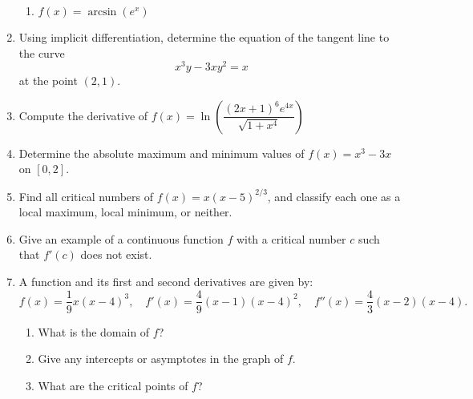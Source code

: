 \documentclass[12pt]{article}
\newcommand{\points}[1]{\marginpar{\hspace{24pt}[#1]}}
\begin{document}
\begin{enumerate}
\begin{enumerate}
 
 \item $f(x) = \arcsin(e^x)$ \points{2}
 \end{enumerate}

 
 \item Using implicit differentiation, determine the equation of the tangent line to the curve \points{6}
 \[
 x^3y-3xy^2=x
 \]
 at the point $(2,1)$.
 
 
 \item Compute the derivative of \points{4}
 $f(x) = \ln\left(\dfrac{(2x+1)^6e^{4x}}{\sqrt{1+x^4}}\right)$ 
 
 

 
 \item Determine the absolute maximum and minimum values of $f(x) = x^3-3x$ on $[0,2]$. \points{4}
 
 
 \item Find all critical numbers of $f(x) = x(x-5)^{2/3}$, and classify each one as a local maximum, local minimum, or neither. \points{4}
 
 
 \item Give an example of a continuous function $f$ with a critical number $c$ such that $f'(c)$ does not exist. \points{2} 
 
 
 \item A function and its first and second derivatives are given by:
 \[
 f(x)=\frac{1}{9}x(x-4)^3,\quad f'(x) = \frac{4}{9}(x-1)(x-4)^2, \quad f''(x) = \frac{4}{3}(x-2)(x-4).
 \]
  
   
  \begin{enumerate}
  \item What is the domain of $f$? \points{1}
  
  
  \item Give any intercepts or asymptotes in the graph of $f$. \points{1}
  
  
  \item What are the critical points of $f$?  \points{1}
  

\end{enumerate}
\end{enumerate}
\end{document}
